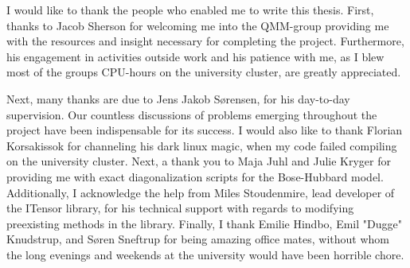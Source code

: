 \begin{acknowledgements}
\addchaptertocentry{\acknowledgementname} %

I would like to thank the people who enabled me to write this thesis. 
First, thanks to Jacob Sherson for welcoming me into the QMM-group providing me with the resources and insight necessary for completing the project. Furthermore, his engagement in activities outside work and his patience with me, as I blew most of the groups CPU-hours on the university cluster, are greatly appreciated.
 
Next, many thanks are due to Jens Jakob S\o rensen, for his day-to-day supervision. Our countless discussions of problems emerging throughout the project have been indispensable for its success. 
I would also like to thank Florian Korsakissok for channeling his dark linux magic, when my code failed compiling on the university cluster. 
Next, a thank you to Maja Juhl and Julie Kryger for providing me with exact diagonalization scripts for the Bose-Hubbard model. 
Additionally, I acknowledge the help from Miles Stoudenmire, lead developer of the ITensor library, for his technical support with regards to modifying preexisting methods in the library. 
Finally, I thank Emilie Hindbo, Emil "Dugge" Knudstrup, and S\o ren Sneftrup for being amazing office mates, without whom the long evenings and weekends at the university would have been horrible chore.


\end{acknowledgements}
